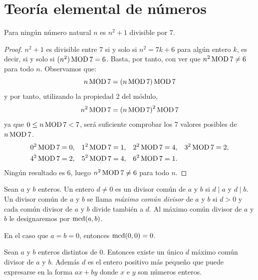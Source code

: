 \section{Teoría elemental de números}

\begin{ejercicio}
    Para ningún número natural $n$ es $n^2 + 1$ divisible por 7.
\end{ejercicio}

\begin{proof}
    $n^2 + 1$ es divisible entre 7 si y solo si $n^2 = 7k + 6$ para algún entero $k$, es decir,
    si y solo si $(n^2) \operatorname{MOD} 7 = 6$.
    Basta, por tanto, con ver que $n^2 \operatorname{MOD} 7 \neq 6$ para todo $n$.
    Observamos que:
    \[ n \operatorname{MOD} 7 = (n \operatorname{MOD} 7) \operatorname{MOD} 7 \]
    y por tanto, utilizando la propiedad 2 del módulo,
    \[ n^2 \operatorname{MOD} 7 = {(n \operatorname{MOD} 7)}^2 \operatorname{MOD} 7 \]
    ya que $0 \le n \operatorname{MOD} 7 < 7$, será suficiente comprobar los 7 valores posibles de $n \operatorname{MOD} 7$.
    \begin{align*}
        0^2 \operatorname{MOD} 7 &= 0, & 1^2 \operatorname{MOD} 7 &= 1, & 2^2 \operatorname{MOD} 7 &= 4, & 3^2 \operatorname{MOD} 7 &= 2, \\
        4^2 \operatorname{MOD} 7 &= 2, & 5^2 \operatorname{MOD} 7 &= 4, & 6^2 \operatorname{MOD} 7 &= 1.
    \end{align*}
    Ningún resultado es 6, luego $n^2 \operatorname{MOD} 7 \neq 6$ para todo $n$.
\end{proof}

\begin{definicion}\label{def:mcd}
    Sean $a$ y $b$ enteros. Un entero $d \neq 0$ es un divisor común de $a$ y $b$ si
    $d \mid a$ y $d \mid b$. Un divisor común de $a$ y $b$ se llama
    \emph{máximo común divisor} de $a$ y $b$ si $d > 0$ y cada común divisor de
    $a$ y $b$ divide también a $d$. Al máximo común divisor de $a$ y $b$
    le designaremos por $\operatorname{mcd}(a, b)$.
    
    En el caso que $a = b = 0$, entonces $\operatorname{mcd}(0, 0) = 0$.
\end{definicion}

\begin{teorema}\label{teo:bezout}
    Sean $a$ y $b$ enteros distintos de $0$. Entonces existe un único $d$ máximo
    común divisor de $a$ y $b$. Además $d$ es el entero positivo más pequeño que
    puede expresarse en la forma $ax + by$ donde $x$ e $y$ son números enteros.
\end{teorema}


